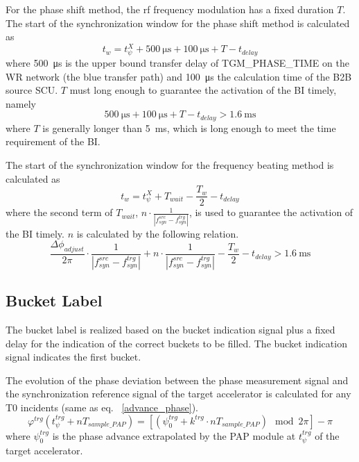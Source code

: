 For the phase shift method, the rf frequency modulation has a fixed duration $T$. The start of the synchronization window for the phase shift method is calculated as
\begin{equation}
t_\mathit{w}=t_\psi^\mathit{X}+\SI{500}{\us}+\SI{100}{\us}+T-t_\mathit{delay}\label{syn_win_start}
\end{equation}
where \SI{500}{\us} is the upper bound transfer delay of TGM\_PHASE\_TIME on the WR network (the blue transfer path) and \SI{100}{\us} the calculation time of the B2B source SCU. $T$ must long enough to guarantee the activation of the BI timely, namely
\begin{equation}
\SI{500}{\us}+\SI{100}{\us}+T-t_\mathit{delay}> \SI{1.6}{\ms}
\end{equation}
where $T$ is generally longer than \SI{5}{\ms}, which is long enough to meet the time requirement of the BI. 

The start of the synchronization window for the frequency beating method is calculated as
\begin{equation}
t_\mathit{w}= t_\psi^\mathit{X}+T_\mathit{wait}-\frac{T_w}{2}-t_\mathit{delay}\label{syn_win_start1}
\end{equation}
where the second term of $T_\mathit{wait}$, $n\cdot \frac{1}{|f_{\mathit{syn}}^\mathit{src}-f_{\mathit{syn}}^\mathit{trg}|}$, is used to guarantee the activation of the BI timely. $n$ is calculated by the following relation.
\begin{equation}
\frac{\Delta \phi_\mathit{adjust}}{2\pi}\cdot\frac{1}{|f_{\mathit{syn}}^\mathit{src}-f_{\mathit{syn}}^\mathit{trg}|}+n\cdot \frac{1}{|f_{\mathit{syn}}^\mathit{src}-f_{\mathit{syn}}^\mathit{trg}|}-\frac{T_w}{2}-t_\mathit{delay}> \SI{1.6}{\ms}
\end{equation}


\subsection{Bucket Label}
\label{sec:bucket_label}
The bucket label is realized based on the bucket indication signal plus a fixed delay for the indication of the correct buckets to be filled. The bucket indication signal indicates the first bucket. 

The evolution of the phase deviation between the phase measurement signal and the synchronization reference signal of the target accelerator is calculated for any T0 incidents (same as eq. ~\ref{advance_phase}).
\begin{equation}
\varphi^\mathit{trg}(t_\mathit{\psi}^\mathit{trg}+nT_\mathit{sample\_PAP})=[(\psi^\mathit{trg}_0+k^\mathit{trg}\cdot nT_\mathit{sample\_PAP}) \mod 2\pi] - \pi
\end{equation}
where $\psi^\mathit{trg}_0$ is the phase advance extrapolated by the PAP module at $t_\mathit{\psi}^\mathit{trg}$ of the target accelerator.

